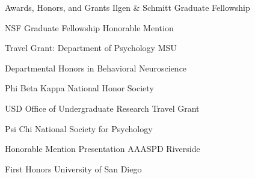 
\begin{rubric}{Awards, Honors, and Grants}
\entry*[October 2018]
	Ilgen \& Schmitt Graduate Fellowship
	
\entry*[April 2018]
	NSF Graduate Fellowship Honorable Mention

\entry*[March 2018]
	Travel Grant: Department of Psychology MSU
	
\entry*[May 2016]
	Departmental Honors in Behavioral Neuroscience
	
\entry*[February 2016]
	Phi Beta Kappa National Honor Society
	
\entry*[January 2016]
	USD Office of Undergraduate Research Travel Grant
	
\entry*[April 2015]
	Psi Chi National Society for Psychology
	
\entry*[June 2014]
	Honorable Mention Presentation AAASPD Riverside
	
\entry*[2012 - 2016]
	First Honors University of San Diego
	
\end{rubric}
